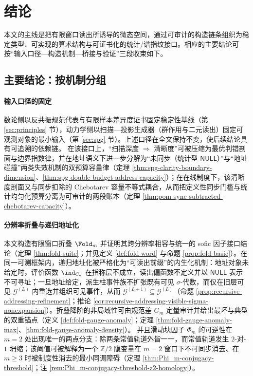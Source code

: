 \section{结论}\label{sec:conclusion}

本文的主线是把有限窗口读出所诱导的微态空间，通过可审计的构造链条组织为稳定类型、可实现的算术结构与可证书化的统计/谱指纹接口。相应的主要结论可按“输入口径—构造机制—桥接与验证”三段收束如下。

\subsection{主要结论：按机制分组}\label{subsec:core-conclusions}
\paragraph{输入口径的固定}
数论侧以反共振规范代表与有限样本差异度证书固定稳定性基线（第 \ref{sec:principles} 节），动力学侧以扫描—投影生成器（群作用与二元读出）固定可观测对象的最小输入（第 \ref{sec:spg} 节）。上述口径在全文保持不变，使后续结论具有可追溯的依赖链。
在该接口上，“扫描深度 \(\Rightarrow\) 清晰度”可被压缩为最优判错剖面与边界指数律，并在地址语义下进一步分解为“未同步（统计型 \(\mathsf{NULL}\)）”与“地址碰撞”两类失效机制的双预算容量律（定理 \ref{thm:spg-clarity-boundary-dimension}、\ref{thm:spg-double-budget-address-capacity}）；在在线制度下，该清晰度剖面又与同步扣除的 Chebotarev 容量不等式耦合，从而把定义性同步门槛与统计均匀化预算分离为可审计的两段账本（定理 \ref{thm:pom-sync-subtracted-chebotarev-capacity}）。

\paragraph{分辨率折叠与递归地址化}
本文构造有限窗口折叠 \(\Fold_m\) 并证明其跨分辨率相容与统一的 sofic 因子接口结论（定理 \ref{thm:fold-suite}；并见定义 \ref{def:fold-word} 与命题 \ref{prop:fold-basic}）。在同一可测框架内，递归地址化被严格化为“可读出前缀”的内生化机制：地址对象未给定时，评价函数 \(\ind_{C_a}\) 在指称层不成立，读出偏函数不定义并以 \(\mathsf{NULL}\) 表示不可寻址；一旦地址给定，派生柱事件族不扩张既有可见 \(\sigma\)-代数，而仅在旧层可见 \(\mathcal{G}^{(L)}\) 内重选并组织可见事件，从而 \(\mathcal{G}^{(L+1)}\subseteq \mathcal{G}^{(L)}\)（命题 \ref{prop:recursive-addressing-refinement}；推论 \ref{cor:recursive-addressing-visible-sigma-nonexpansion}）。折叠降阶的非局域性可由规范差 \(G_m\) 定量审计并给出最坏与典型的双重锚点（定义 \ref{def:fold-gauge-anomaly}；定理 \ref{thm:fold-gauge-anomaly-max}、\ref{thm:fold-gauge-anomaly-density}）。
并且滑动块因子 \(\Phi_m\) 的可逆性在 \(m=2\) 处出现唯一的两点分支：除两条常值轨道外皆一一，而常值轨道发生 \(2\)-对-\(1\) 坍缩；该阈值可被解释为一个 \(\mathbb{Z}/2\) 隐变量在 \(m=2\) 窗口下不可同步消去、在 \(m\ge 3\) 时被制度性消去的最小同调障碍（定理 \ref{thm:Phi_m-conjugacy-threshold}；注 \ref{rem:Phi_m-conjugacy-threshold-z2-homology}）。

